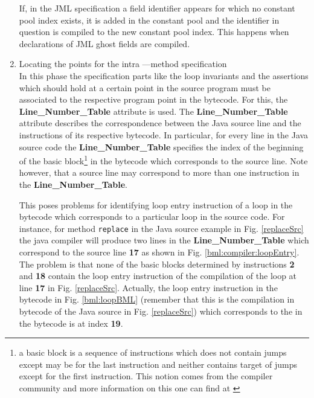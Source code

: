 \begin{enumerate}
      If, in the JML specification a field
      identifier appears for which no constant pool index exists, it is added in the constant pool and the identifier in question
      is compiled to the new constant pool index. This happens when declarations of JML ghost fields are compiled. 
     

  





      

\item Locating the points for the intra ---method specification \\

      In this phase the specification parts like the loop invariants and the assertions
      which should hold at a certain point in the source program must be associated to the
      respective program point in the bytecode. For this, the 
      \textbf{Line\_Number\_Table} attribute is used. The \textbf{Line\_Number\_Table} attribute
      describes the correspondence between the Java source line and the instructions of its respective bytecode.
      In particular, for every line in the Java source code the   \textbf{Line\_Number\_Table}  specifies the index 
      of the beginning of the basic block\footnote{a basic block is a sequence of instructions which does not contain jumps except
	may be for the last instruction and neither contains target of jumps except for the first instruction. 
	This notion comes from the compiler community and 
	more information on this one can find at \cite{ARUCom1986}} in the bytecode which corresponds to the source line. 
      Note however, that a source line may correspond to more than one instruction in the \textbf{Line\_Number\_Table}. 
     
      This poses problems for  identifying loop entry instruction of a loop in the bytecode
      which corresponds to a particular loop in the source  code. %
       For instance, for method \texttt{replace} in
      the Java source example in Fig. \ref{replaceSrc} the java compiler will  produce two lines in the 
       \textbf{Line\_Number\_Table} which correspond to the source line \textbf{17}  as shown in Fig. \ref{bml:compiler:loopEntry}.
       The problem is that none of the basic blocks determined by instructions  \textbf{2} and  \textbf{18} contain the loop entry instruction of the compilation
       of the loop at line \textbf{17} in Fig. \ref{replaceSrc}. Actually, the loop entry instruction in the bytecode in 
       Fig. \ref{bml:loopBML} (remember that this is the compilation in bytecode of the Java source in Fig. \ref{replaceSrc}) which corresponds to the 
       in the bytecode is at index \textbf{19}.
  

\end{enumerate}
